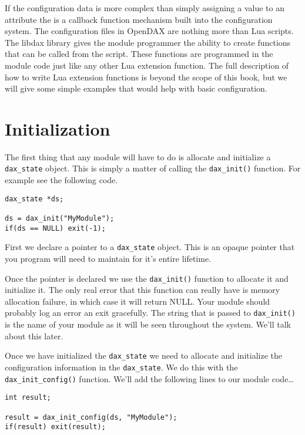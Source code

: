 If the configuration data is more complex than simply assigning a value to an attribute the is a callback function mechanism built into the configuration system.  The configuration files in OpenDAX are nothing more than Lua scripts.  The libdax library gives the module programmer the ability to create functions that can be called from the script.  These functions are programmed in the module code just like any other Lua extension function.  The full description of how to write Lua extension functions is beyond the scope of this book, but we will give some simple examples that would help with basic configuration.

\section{Initialization}

The first thing that any module will have to do is allocate and initialize a \verb|dax_state| object.  This is simply a matter of calling the \verb|dax_init()| function.  For example see the following code.

\begin{verbatim}
dax_state *ds;

ds = dax_init("MyModule");
if(ds == NULL) exit(-1);
\end{verbatim}

First we declare a pointer to a \verb|dax_state| object.  This is an opaque pointer that you program will need to maintain for it's entire lifetime.

Once the pointer is declared we use the \verb|dax_init()| function to allocate it and initialize it.  The only real error that this function can really have is memory allocation failure, in which case it will return NULL.  Your module should probably log an error an exit gracefully.  The string that is passed to \verb|dax_init()| is the name of your module as it will be seen throughout the system.  We'll talk about this later.

Once we have initialized the \verb|dax_state| we need to allocate and initialize the configuration information in the \verb|dax_state|.  We do this with the \verb|dax_init_config()| function.  We'll add the following lines to our module code\ldots

\begin{verbatim}
int result;

result = dax_init_config(ds, "MyModule");
if(result) exit(result);
\end{verbatim}


